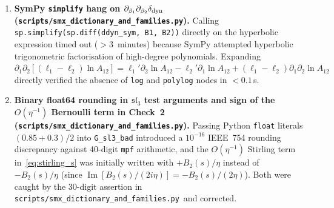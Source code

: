 \documentclass[11pt,a4paper]{article}
\newcommand{\smxdict}{\texttt{scripts/\allowbreak smx\_\allowbreak dictionary\_\allowbreak and\_\allowbreak families.py}}
\theoremstyle{remark}
\begin{document}
\begin{enumerate}
\item \textbf{SymPy \texttt{simplify} hang on $\partial_{\beta_1}\partial_{\beta_2}\delta_{\rm dyn}$ (\smxdict).}
Calling \texttt{sp.simplify(sp.diff(ddyn\_sym, B1, B2))} directly on the hyperbolic expression timed out ($>3$~minutes) because SymPy attempted hyperbolic trigonometric factorisation of high-degree polynomials. Expanding $\partial_1\partial_2[(\ell_1-\ell_2)\ln A_{12}]=\ell_1'\partial_2\ln A_{12}-\ell_2'\partial_1\ln A_{12}+(\ell_1-\ell_2)\partial_1\partial_2\ln A_{12}$ directly verified the absence of \texttt{log} and \texttt{polylog} nodes in $<0.1\,$s.
\item \textbf{Binary float64 rounding in $\mathfrak{sl}_3$ test arguments and sign of the $O(\eta^{-1})$ Bernoulli term in Check~2 (\smxdict).}
Passing Python \texttt{float} literals $(0.85+0.3)/2$ into \texttt{G\_sl3\_bad} introduced a $10^{-16}$ IEEE~754 rounding discrepancy against 40-digit \texttt{mpf} arithmetic, and the $O(\eta^{-1})$ Stirling term in~\eqref{eq:stirling_s} was initially written with $+B_2(s)/\eta$ instead of $-B_2(s)/\eta$ (since $\operatorname{Im}[B_2(s)/(2i\eta)]=-B_2(s)/(2\eta)$). Both were caught by the 30-digit assertion in \smxdict\ and corrected.
\end{enumerate}
\end{document}
